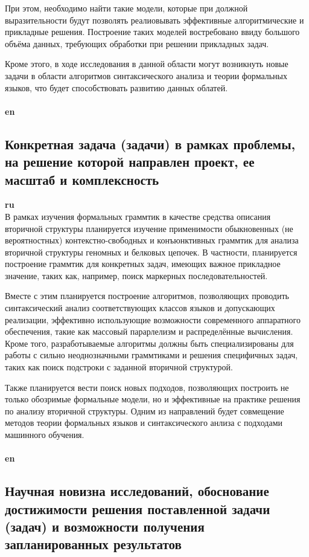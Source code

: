﻿\documentclass[12pt]{article}  %
\theoremstyle{remark}
\begin{document}
При этом, необходимо найти такие модели, которые при должной выразительности будут позволять реалиовывать эффективные алгоритмические и прикладные решения.
Построение таких моделей востребовано ввиду большого объёма данных, требующих обработки при решении прикладных задач.

Кроме этого, в ходе исследования в данной области могут возникнуть новые задачи в области алгоритмов синтаксического анализа и теории формальных языков, что будет способствовать развитию данных облатей.
\\
\\
\textbf{en}\\



\subsection{Конкретная задача (задачи) в рамках проблемы, на решение которой направлен проект, ее масштаб и комплексность}

\textbf{ru}\\
В рамках изучения формальных граммтик в качестве средства описания вторичной структуры планируется изучение применимости обыкновенных (не вероятностных) контекстно-свободных и конъюнктивных граммтик для анализа вторичной структуры геномных и белковых цепочек.
В частности, планируется построение граммтик для конкретных задач, имеющих важное прикладное значение, таких как, например, поиск маркерных последовательностей.

Вместе с этим планируется построение алгоритмов, позволяющих проводить синтаксический анализ соответствующих классов языков и допускающих реализации, эффективно использующие возможности современного аппаратного обеспечения, такие как массовый парарлелизм и распределённые вычисления.
Кроме того, разработываемые алгоритмы должны быть специализированы для работы с сильно неоднозначными граммтиками и решения специфичных задач, таких как поиск подстроки с заданной вторичной структурой.

Также планируется вести поиск новых подходов, позволяющих построить не только обозримые формальные модели, но и эффективные на практике решения по анализу вторичной структуры.
Одним из направлений будет совмещение методов теории формальных языков и синтаксического анлиза с подходами машинного обучения.
\\
\\
\textbf{en}\\


\subsection{Научная новизна исследований, обоснование достижимости решения поставленной задачи (задач) и возможности получения запланированных результатов}
\end{document}
